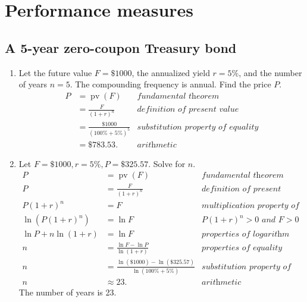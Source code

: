\documentclass[12pt]{article}
\DeclareMathOperator{\pv}{pv}
\begin{document}
\section{Performance measures}
\subsection{A 5-year zero-coupon Treasury bond}
\begin{enumerate}
\item Let the future value $F=\$1000$, the annualized yield $r=5\%$, and the number of years $n=5$. The compounding frequency is annual. Find the price $P$.
\begin{align*}
P
&=\pv(F)&\textit{fundamental theorem}\\
&=\frac{F}{(1+r)^n}&\textit{definition of present value}\\
&=\frac{\$1000}{(100\%+5\%)^5}&\textit{substitution property of equality}\\
&=\$783.53.&\textit{arithmetic}
\end{align*}
\item Let $F=\$1000,r=5\%,P=\$325.57$. Solve for $n$.
\begin{align*}
P&=\pv(F)&\textit{fundamental theorem}\\
P&=\frac{F}{(1+r)^n}&\textit{definition of present value}\\
P(1+r)^n&=F&\textit{multiplication property of equality}\\
\ln\left(P(1+r)^n\right)&=\ln{F}&\textit{$P(1+r)^n>0$ and $F>0$}\\
\ln{P}+n\ln(1+r)&=\ln{F}&\textit{properties of logarithm}\\
n&=\frac{\ln{F}-\ln{P}}{\ln(1+r)}&\textit{properties of equality}\\
n&=\frac{\ln(\$1000)-\ln(\$325.57)}{\ln(100\%+5\%)}&\textit{substitution property of equality}\\
n&\approx 23.&\textit{arithmetic}
\end{align*}
The number of years is 23.
\end{enumerate}
\end{document}
